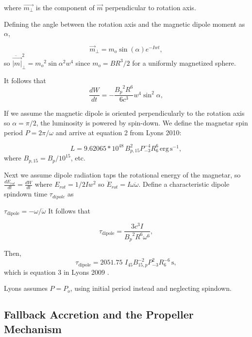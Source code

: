 \documentclass{article}
\begin{document}
where $\vec{m_\perp}$ is the component of $\vec{m}$ perpendicular to rotation axis.

Defining the angle between the rotation axis and the magnetic dipole moment as $\alpha$,

\begin{equation}\vec{m}_\perp = m_o  \sin({\alpha}) e^{-Iwt},\end{equation}
so $\ddot{\vec{|m|}}_\perp^2 = {m_o}^2 \sin{\alpha}^2 w^4$
since $m_o = B R^3/2$ for a uniformly magnetized sphere.

It follows that \begin{equation} \label{eq:lumin}\frac{dW}{dt} = -\frac{{B_p}^2 R^6}{6c^3} w^4 \sin^2{\alpha},\end{equation}

If we assume the magnetic dipole is oriented perpendicularly to the rotation axis so $\alpha=\pi/2$, the luminosity is powered by spin-down. We define the magnetar spin period $P= 2\pi/\omega$ and arrive at equation 2 from Lyons 2010:

\begin{equation} L  = 9.62065*10^{48}\, B^2_{p,15} P^{-4}_{-3} R^6_ 6\,\mathrm{erg \,s^{-1}},\end{equation}
where $B_{p,15} = B_p/10^{15}$, etc.

Next we assume dipole radiation taps the rotational energy of the magnetar, so $\frac{dE_{rot}}{dt} = \frac{dW}{dt}$ where $E_{rot} = 1/2 I w^2$ so $\ddot{E}_{rot} = I \omega \ddot{\omega}$. Define a characteristic dipole spindown time $\tau_{dipole}$ as

$\tau_{\mathrm{dipole}} = - \omega/\ddot{\omega}$
It follows that

\begin{equation}\tau_{\mathrm{dipole}} = \frac{3c^3 I}{{B_p}^2 R^6 \omega^6},
\end{equation}

Then, \begin{equation}\tau_{\mathrm{dipole}} = 2051.75\,\, I_{45} B^{-2}_{15,p} P^2_{-3} R_6^{-6}\,\mathrm{s},\end{equation}  which is equation 3 in Lyons 2009 \cite{Lyons:2009ka}.

Lyons assumes $P=P_o$, using initial period instead and neglecting spindown.

\subsection{Fallback Accretion and the Propeller Mechanism} \label{sec:fallback}
\end{document}
